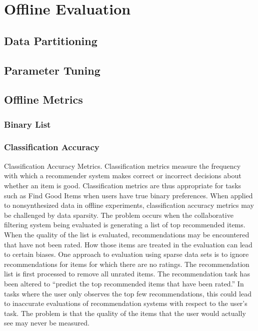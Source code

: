 \section{Offline Evaluation}

\subsection{Data Partitioning}

\subsection{Parameter Tuning}

\subsection{Offline Metrics}

\subsubsection{Binary List}

\subsubsection{Classification Accuracy}
Classification Accuracy Metrics. Classification metrics measure the
frequency with which a recommender system makes correct or incorrect decisions
about whether an item is good. Classification metrics are thus appropriate
for tasks such as Find Good Items when users have true binary preferences.
When applied to nonsynthesized data in offline experiments, classification
accuracy metrics may be challenged by data sparsity. The problem occurs when
the collaborative filtering system being evaluated is generating a list of top
recommended items. When the quality of the list is evaluated, recommendations
may be encountered that have not been rated. How those items are treated in
the evaluation can lead to certain biases.
One approach to evaluation using sparse data sets is to ignore recommendations
for items for which there are no ratings. The recommendation list is first
processed to remove all unrated items. The recommendation task has been altered
to “predict the top recommended items that have been rated.” In tasks
where the user only observes the top few recommendations, this could lead to
inaccurate evaluations of recommendation systems with respect to the user’s task. The problem is that the quality of the items that the user would actually
see may never be measured.

